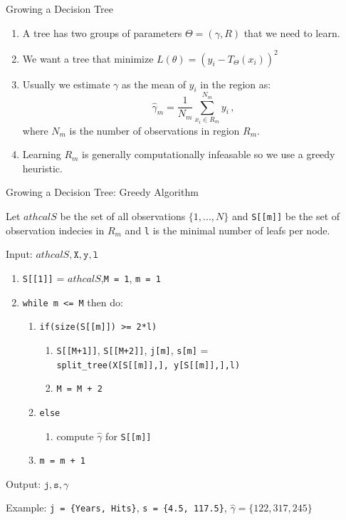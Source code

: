 \documentclass[11pt,aspectratio=1610,usenames,dvipsnames]{beamer} %
\begin{document}
\begin{frame}{Growing a Decision Tree}
	
	\begin{enumerate}
		\item A tree has two groups of parameters $\Theta = (\gamma, R)$ that we need to learn.
		\item We want a tree that minimize $L(\theta) = (y_i - T_\Theta(x_i))^2$
		\item Usually we estimate $\gamma$ as the mean of $y_i$ in the region as:
		\[
		\hat{\gamma}_m = \frac{1}{N_m} \sum_{x_i \in R_m}^{N_m} y_i\,,
		\]
		where $N_m$ is the number of observations in region $R_m$.
		\item Learning $R_m$ is generally computationally infeasable so we use a greedy heuristic.
	\end{enumerate}
	
\end{frame}



\begin{frame}{Growing a Decision Tree: Greedy Algorithm}
	
	
	Let $athcal{S}$ be the set of all observations $\{1,...,N\}$ and \texttt{S[[m]]} be the set of observation indecies in $R_m$ and \texttt{l} is the minimal number of leafs per node.
	
	Input: $athcal{S}, \texttt{X}, \texttt{y}, \texttt{l}$
	
	\begin{enumerate}
		\item[] \texttt{S[[1]]} = $athcal{S}$,\texttt{M = 1}, \texttt{m = 1}
		\item[] \texttt{while m <= M} then do:
		\begin{enumerate}
			\item[] \texttt{if(size(S[[m]]) >= 2*l)}
			\begin{enumerate}
				\item[] \texttt{S[[M+1]]}, \texttt{S[[M+2]]}, \texttt{j[m]}, \texttt{s[m]} = \\ \texttt{split\_tree(X[S[[m]],], y[S[[m]],],l)}
				\item[] \texttt{M = M + 2}
			\end{enumerate}
			\item[] \texttt{else}
			\begin{enumerate}
				\item[] compute $\hat{\gamma}$ for \texttt{S[[m]]}
			\end{enumerate}
			\item[] \texttt{m = m + 1}
		\end{enumerate}
	\end{enumerate}
	
	Output: $\texttt{j}, \texttt{s}, \gamma$
	
	Example:
	\texttt{j = \{Years, Hits\}}, \texttt{s = \{4.5, 117.5\}}, $\hat{\gamma} = \{122, 317, 245\}$
	
\end{frame}
\end{document}
